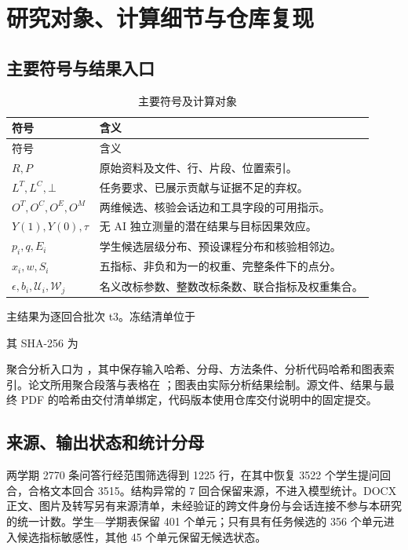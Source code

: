 \section{研究对象、计算细节与仓库复现}\label{app:repro/protocol}
\subsection{主要符号与结果入口}
\begin{longtable}{@{}p{}p{}@{}}
\caption{主要符号及计算对象}\\\toprule 符号 & 含义\\\midrule\endfirsthead
\toprule 符号 & 含义\\\midrule\endhead
$R,P$ & 原始资料及文件、行、片段、位置索引。\\
$L^T,L^C,\bot$ & 任务要求、已展示贡献与证据不足的弃权。\\
$O^T,O^C,O^E,O^M$ & 两维候选、核验会话边和工具字段的可用指示。\\
$Y(1),Y(0),\tau$ & 无 AI 独立测量的潜在结果与目标因果效应。\\
$p_i,q,E_i$ & 学生候选层级分布、预设课程分布和核验相邻边。\\
$x_i,w,S_i$ & 五指标、非负和为一的权重、完整条件下的点分。\\
$\epsilon,b_i,\mathcal U_i,\mathcal W_j$ & 名义改标参数、整数改标条数、联合指标及权重集合。\\
\bottomrule
\end{longtable}

主结果为逐回合批次 t3。冻结清单位于
\begin{center}\small{}\end{center}
其 SHA-256 为\par\noindent\small{}\normalsize\par
聚合分析入口为 ，其中保存输入哈希、分母、方法条件、分析代码哈希和图表索引。论文所用聚合段落与表格在 ；图表由实际分析结果绘制。源文件、结果与最终 PDF 的哈希由交付清单绑定，代码版本使用仓库交付说明中的固定提交。

\subsection{来源、输出状态和统计分母}
两学期 2770 条问答行经范围筛选得到 1225 行，在其中恢复 3522 个学生提问回合，合格文本回合 3515。结构异常的 7 回合保留来源，不进入模型统计。DOCX 正文、图片及转写另有来源清单，未经验证的跨文件身份与会话连接不参与本研究的统一计数。学生—学期表保留 401 个单元；只有具有任务候选的 356 个单元进入候选指标敏感性，其他 45 个单元保留无候选状态。


